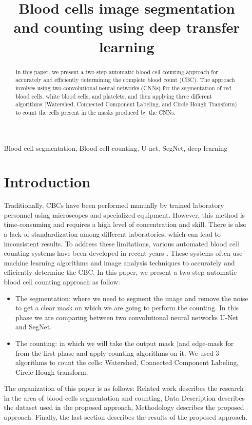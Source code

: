 \documentclass[conference]{IEEEtran}
\begin{document}
\title{Blood cells image segmentation and counting using deep transfer learning}
\author{
}
\maketitle
\begin{abstract}
In this paper, we present a two-step automatic blood cell counting approach for accurately and efficiently determining the complete blood count (CBC). The approach involves using two convolutional neural networks (CNNs) for the segmentation of red blood cells, white blood cells, and platelets, and then applying three different algorithms (Watershed, Connected Component Labeling, and Circle Hough Transform) to count the cells present in the masks produced by the CNNs.
\end{abstract}
\begin{IEEEkeywords}
Blood cell segmentation, Blood cell counting, U-net, SegNet, deep learning
\end{IEEEkeywords}

\section{Introduction}
Traditionally, CBCs have been performed manually by trained laboratory personnel using microscopes and specialized equipment. However, this method is time-consuming and requires a high level of concentration and skill. There is also a lack of standardization among different laboratories, which can lead to inconsistent results.
To address these limitations, various automated blood cell counting systems have been developed in recent years \cite{ref1}. These systems often use machine learning algorithms and image analysis techniques to accurately and efficiently determine the CBC.
In this paper, we present a two-step automatic blood cell counting approach as follow: 
\begin{itemize}
\item The segmentation: where we need to segment the image and remove the noise to get a clear mask on which we are going to perform the counting. In this phase we are comparing between two convolutional neural networks U-Net and SegNet.
\item The counting: in which we will take the output mask (and edge-mask for from the first phase and apply counting algorithms on it. We used 3 algorithms to count the cells: Watershed, Connected Component Labeling, Circle Hough transform.
\end{itemize}
The organization of this paper is as follows: Related work describes the research in the area of blood cells segmentation and counting, Data Description describes the dataset used in the proposed approach, Methodology describes the proposed approach. Finally, the last section describes the results of the proposed approach.
\end{document}
